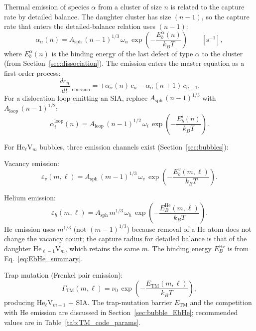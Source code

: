 \documentclass[pdflatex,sn-basic]{sn-jnl} %
\begin{document}
Thermal emission of species $\alpha$ from a cluster of size $n$ is related to
the capture rate by detailed balance. The daughter cluster has size $(n-1)$, so
the capture rate that enters the detailed-balance relation uses $(n-1)$:
\begin{equation}\label{eq:emission}
    \alpha_\alpha(n)
    = A_{\mathrm{sph}}\,(n-1)^{1/3}\,\omega_\alpha\,
      \exp\!\left(-\frac{E_b^\alpha(n)}{k_BT}\right)
    \qquad [\text{s}^{-1}],
\end{equation}
where $E_b^\alpha(n)$ is the binding energy of the last defect of type $\alpha$
to the cluster (from Section~\ref{sec:dissociation}). The emission enters the
master equation as a first-order process:
\begin{equation}\label{eq:emission_master}
    \frac{dc_n}{dt}\bigg|_{\text{emission}}
    = +\alpha_\alpha(n)\,c_n - \alpha_\alpha(n+1)\,c_{n+1}.
\end{equation}
For a dislocation loop emitting an SIA, replace $A_{\mathrm{sph}}\,(n-1)^{1/3}$
with $A_{\mathrm{loop}}\,(n-1)^{1/2}$:
\begin{equation}\label{eq:emission_loop}
    \alpha_i^{\mathrm{loop}}(n)
    = A_{\mathrm{loop}}\,(n-1)^{1/2}\,\omega_i\,
      \exp\!\left(-\frac{E_b^i(n)}{k_BT}\right).
\end{equation}

For He$_\ell$V$_m$ bubbles, three emission channels exist
(Section~\ref{sec:bubbles}):

Vacancy emission:
\begin{equation}\label{eq:emit_v_bubble}
    \varepsilon_v(m,\ell)
    = A_{\mathrm{sph}}\,(m-1)^{1/3}\,\omega_v\,
      \exp\!\left(-\frac{E_b^v(m,\ell)}{k_BT}\right).
\end{equation}

Helium emission:
\begin{equation}\label{eq:emit_He_bubble}
    \varepsilon_h(m,\ell)
    = A_{\mathrm{sph}}\,m^{1/3}\,\omega_h\,
      \exp\!\left(-\frac{E_B^{\mathrm{He}}(m,\ell)}{k_BT}\right).
\end{equation}
He emission uses $m^{1/3}$ (not $(m{-}1)^{1/3}$) because removal of a He
atom does not change the vacancy count; the capture radius for detailed
balance is that of the daughter He$_{\ell-1}$V$_m$, which retains the same
$m$.  The binding energy $E_B^{\mathrm{He}}$ is from
Eq.~\eqref{eq:EbHe_summary}.

Trap mutation (Frenkel pair emission):
\begin{equation}\label{eq:trap_mutation_rate}
    \Gamma_{\mathrm{TM}}(m,\ell)
    = \nu_0\,\exp\!\left(-\frac{E_{\mathrm{TM}}(m,\ell)}{k_BT}\right),
\end{equation}
producing He$_\ell$V$_{m+1}$ + SIA. The trap-mutation barrier
$E_{\mathrm{TM}}$ and the competition with He emission are discussed in
Section~\ref{sec:bubble_EbHe}; recommended values are in
Table~\ref{tab:TM_code_params}.
\end{document}
